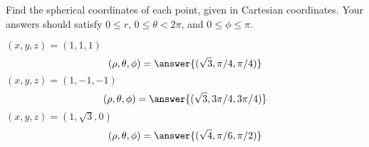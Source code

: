 \begin{problem}
Find the spherical coordinates of each point, given in Cartesian coordinates. Your answers should satisfy $0\leq r$, $0\leq\theta < 2\pi$, and $0\leq \phi\leq \pi$.

$(x,y,z) = (1,1,1)$
\[
(\rho,\theta,\phi) = \answer{(\sqrt{3}, \pi/4, \pi/4)}
\]
$(x,y,z) = (1, -1, -1)$
\[
(\rho,\theta,\phi) = \answer{(\sqrt{3}, 3\pi/4, 3\pi/4)}
\]
$(x,y,z) = (1,\sqrt{3},0)$
\[
(\rho,\theta,\phi) = \answer{(\sqrt{4}, \pi/6, \pi/2)}
\]
\end{problem}